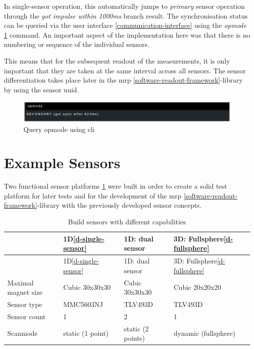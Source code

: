 In single-sensor operation, this automatically jumps to \emph{primary}
sensor operation through the \emph{got impulse within 1000ms} branch
result. The synchronisation status can be queried via the user interface
\ref{communication-interface} using the \emph{opmode}
\ref{Query_opmode_using_(+cli).png} command. An important aspect of the
implementation here was that there is no numbering or sequence of the
individual sensors.

This means that for the subsequent readout of the measurements, it is
only important that they are taken at the same interval across all
sensors. The sensor differentiation takes place later in the \gls{mrp}
\ref{software-readout-framework}-library by using the sensor \gls{uuid}.

\begin{figure}
\centering
\includegraphics{./generated_images/border_Query_opmode_using_(+cli).png}
\caption{Query opmode using \gls{cli}
\label{Query_opmode_using_(+cli).png}}
\end{figure}

\hypertarget{example-sensors}{%
\section{Example Sensors}\label{example-sensors}}

Two functional sensor platforms
\ref{Build_sensors_with_different_capabilities.csv} were built in order
to create a solid test platform for later tests and for the development
of the \gls{mrp} \ref{software-readout-framework}-library with the
previously developed sensor concepts.

\begin{longtable}[]{@{}llll@{}}
\caption{Build sensors with different capabilities
\label{Build_sensors_with_different_capabilities.csv}}\tabularnewline
\toprule
& 1D\ref{d-single-sensor} & 1D: dual sensor & 3D:
Fullsphere\ref{d-fullsphere}\tabularnewline
\midrule
\endfirsthead
\toprule
& 1D\ref{d-single-sensor} & 1D: dual sensor & 3D:
Fullsphere\ref{d-fullsphere}\tabularnewline
\midrule
\endhead
Maximal magnet size & Cubic 30x30x30 & Cubic 30x30x30 & Cubic
20x20x20\tabularnewline
Sensor type & MMC5603NJ & TLV493D & TLV493D\tabularnewline
Sensor count & 1 & 2 & 1\tabularnewline
Scanmode & static (1 point) & static (2 points) & dynamic
(fullsphere)\tabularnewline
\bottomrule
\end{longtable}


